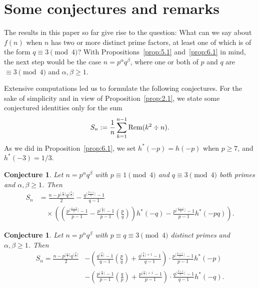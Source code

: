 \documentclass{amsart}
\theoremstyle{plain}
\newtheorem{conjecture}[theorem]{Conjecture}
\numberwithin{equation}{section}
\begin{document}
\section{Some conjectures and remarks}\label{sec:7}

The results in this paper so far give rise to the question: What can we say
about $f(n)$ when $n$ has two or more distinct prime factors, at least one of
which is of the form $q\equiv 3\pmod{4}$? With Propositions~\ref{prop:5.1} 
and~\ref{prop:6.1} in mind, the next step would be the case 
$n=p^{\alpha}q^{\beta}$, where one or both of $p$ and $q$ are $\equiv 3\pmod{4}$
and $\alpha, \beta\geq 1$.

Extensive computations led us to formulate the following conjectures. For the
sake of simplicity and in view of Proposition~\ref{prop:2.1}, we state some
conjectured identities only for the sum
\[
S_n:=\frac{1}{n}\sum_{k=1}^{n-1}{\rm Rem}(k^2\div n).
\]
As we did in Proposition~\ref{prop:6.1}, we set $h^*(-p)=h(-p)$ when 
$p\geq 7$, and $h^*(-3)=1/3$.

\begin{conjecture}\label{conj:7.1}
Let $n=p^{\alpha}q^{\beta}$ with $p\equiv 1\pmod{4}$ and $q \equiv 3\pmod{4}$
both primes and $\alpha, \beta\geq 1$. Then
\begin{align}
S_n &= 
\frac{n-p^{\lfloor\frac{\alpha}{2}\rfloor}q^{\lfloor\frac{\beta}{2}\rfloor}}{2}
-\frac{q^{\lfloor\frac{\beta+1}{2}\rfloor}-1}{q-1}\label{7.1}\\
&\quad\times\left(\left(\frac{p^{\lfloor\frac{\alpha+2}{2}\rfloor}-1}{p-1}
-\frac{p^{\lfloor\frac{\alpha}{2}\rfloor}-1}{p-1}\left(\frac{p}{q}\right)\right)
h^*(-q)-\frac{p^{\lfloor\frac{\alpha+1}{2}\rfloor}-1}{p-1}h^*(-pq)\right).\nonumber
\end{align}
\end{conjecture}

\begin{conjecture}\label{conj:7.2}
Let $n=p^{\alpha}q^{\beta}$ with $p\equiv q\equiv 3\pmod{4}$ distinct primes and $\alpha, \beta\geq 1$. Then
\begin{align}
S_n =
\frac{n-p^{\lfloor\frac{\alpha}{2}\rfloor}q^{\lfloor\frac{\beta}{2}\rfloor}}{2}
&-\left(\frac{q^{\lfloor\frac{\beta}{2}\rfloor}-1}{q-1}\left(\frac{p}{q}\right)
+\frac{q^{\lfloor\frac{\beta}{2}\rfloor+1}-1}{q-1}\right)\cdot
\frac{p^{\lfloor\frac{\alpha+1}{2}\rfloor}-1}{p-1}h^*(-p) \label{7.2}\\
&-\left(\frac{p^{\lfloor\frac{\alpha}{2}\rfloor}-1}{p-1}\left(\frac{q}{p}\right)
+\frac{p^{\lfloor\frac{\alpha}{2}\rfloor+1}-1}{p-1}\right)\cdot
\frac{q^{\lfloor\frac{\beta+1}{2}\rfloor}-1}{q-1}h^*(-q). \nonumber
\end{align}
\end{conjecture}
\end{document}

